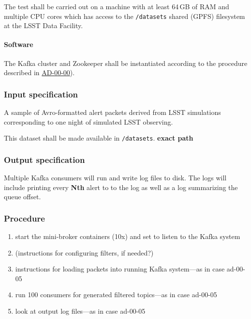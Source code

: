 The test shall be carried out on a machine with at least 64\,GB of RAM and
multiple CPU cores which has access to the \texttt{/datasets} shared (GPFS)
filesystem at the LSST Data Facility.

\paragraph{Software}

The Kafka cluster and Zookeeper shall be instantiated according to the 
procedure described in \hyperref[ad-00-00]{AD-00-00}).

\subsubsection{Input specification}

A sample of Avro-formatted alert packets derived from LSST simulations corresponding to one night of simulated LSST observing.

This dataset shall be made available in \texttt{/datasets}.  \textbf{exact path}

\subsubsection{Output specification}

Multiple Kafka consumers will run and write log files to disk.
The logs will include printing every \textbf{Nth} alert to to the log as well as a log summarizing the queue offset.


\subsubsection{Procedure}

\begin{enumerate}

  \item{start the mini-broker containers (10x) and set to listen to the Kafka system}

  \item{(instructions for configuring filters, if needed?)}

  \item{instructions for loading packets into running Kafka system---as in case ad-00-05}

  \item{run 100 consumers for generated filtered topics---as in case ad-00-05}

  \item{look at output log files---as in case ad-00-05}

\end{enumerate}
